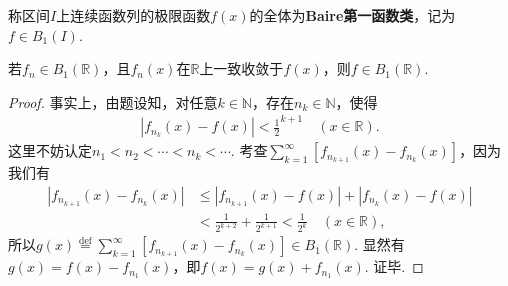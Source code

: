 \documentclass[../../main.tex]{subfiles}%
\begin{document}
\begin{definition}[Baire第一函数类]
称区间$I$上连续函数列的极限函数$f(x)$的全体为\textbf{Baire第一函数类}，记为$f\in B_1(I)$.
\end{definition}

\begin{theorem}\label{theorem:Baire第一函数类的性质1}
若$f_n\in B_1(\mathbb{R})$，且$f_n(x)$在$\mathbb{R}$上一致收敛于$f(x)$，则$f\in B_1(\mathbb{R})$.
\end{theorem}
\begin{proof}

事实上，由题设知，对任意$k\in\mathbb{N}$，存在$n_k\in\mathbb{N}$，使得
\begin{align*}
|f_{n_k}(x)-f(x)|<\frac{1}{2}^{k + 1} \quad (x\in\mathbb{R}).
\end{align*}
这里不妨认定$n_1 < n_2 < \cdots < n_k < \cdots$. 考查$\sum_{k = 1}^{\infty}[f_{n_{k + 1}}(x)-f_{n_k}(x)]$，因为我们有
\begin{align*}
|f_{n_{k + 1}}(x)-f_{n_k}(x)| &\leqslant |f_{n_{k + 1}}(x)-f(x)|+|f_{n_k}(x)-f(x)| \\
&<\frac{1}{2^{k + 2}}+\frac{1}{2^{k + 1}}<\frac{1}{2^{k}} \quad (x\in\mathbb{R}),
\end{align*}
所以$g(x)\stackrel{\text{def}}{=}\sum_{k = 1}^{\infty}[f_{n_{k + 1}}(x)-f_{n_k}(x)]\in B_1(\mathbb{R})$. 显然有$g(x)=f(x)-f_{n_1}(x)$，即$f(x)=g(x)+f_{n_1}(x)$. 证毕.

\end{proof}
\end{document}
